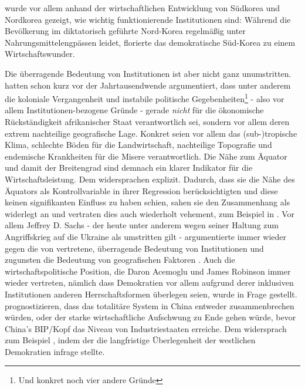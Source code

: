 \textcite{Acemoglu2003} wurde vor allem anhand der wirtschaftlichen Entwicklung von Südkorea und Nordkorea gezeigt, wie wichtig funktionierende Institutionen sind: Während die Bevölkerung im diktatorisch geführte Nord-Korea regelmäßig unter Nahrungsmittelengpässen leidet, florierte das demokratische Süd-Korea zu einem Wirtschaftswunder.

Die überragende Bedeutung von Institutionen ist aber nicht ganz unumstritten. \textcite{Bloom1998} hatten schon kurz vor der Jahrtausendwende argumentiert, dass unter anderem die koloniale Vergangenheit und instabile politische Gegebenheiten\footnote{Und konkret noch vier andere Gründe} - also vor allem Institutionen-bezogene Gründe - gerade \textit{nicht} für die ökonomische Rückständigkeit afrikanischer Staat verantwortlich sei, sondern vor allem deren extrem nachteilige geografische Lage. Konkret seien vor allem das (sub-)tropische Klima, schlechte Böden für die Landwirtschaft, nachteilige Topografie und endemische Krankheiten\parencite[S. 211]{Bloom1998} für die Misere verantwortlich. Die Nähe zum Äquator \parencite[S. 218]{Bloom1998} und damit der Breitengrad sind demnach ein klarer Indikator für die Wirtschaftsleistung. Dem widersprachen \textcite{Acemoglu2001} explizit. Dadurch, dass sie die Nähe des Äquators als Kontrollvariable in ihrer Regression berücksichtigten und diese keinen signifikanten Einfluss zu haben schien, sahen sie den Zusammenhang als widerlegt an und vertraten dies auch wiederholt vehement, zum Beispiel in  \textcite{Acemoglu2012}. Vor allem Jeffrey D. Sachs - der heute unter anderem wegen seiner  Haltung zum Angriffskrieg auf die Ukraine als umstritten gilt - argumentierte immer wieder gegen die von \textcite{Acemoglu2001, Acemoglu2012} vertretene, überragende Bedeutung von Institutionen und zugunsten die Bedeutung von geografischen Faktoren \parencite{Rappaport2003, Sachs2012}. Auch die wirtschaftspolitische Position, die Daron Acemoglu und James Robinson \parencite{Acemoglu2000, Acemoglu2000a, Acemoglu2003, Acemoglu2006, Acemoglu2006a, Acemoglu2008, Acemoglu2012} immer wieder vertreten, nämlich dass Demokratien vor allem aufgrund derer inklusiven Institutionen anderen Herrschaftsformen überlegen seien, wurde in Frage gestellt. \textcite{Acemoglu2012} prognostizieren, dass das totalitäre System in China entweder zusammenbrechen würden, oder der starke wirtschaftliche Aufschwung zu Ende gehen würde, bevor China's BIP/Kopf das Niveau von Industriestaaten erreiche. Dem widersprach zum Beispiel \textcite{Milanovic2019}, indem der die langfristige Überlegenheit der westlichen Demokratien infrage stellte.

